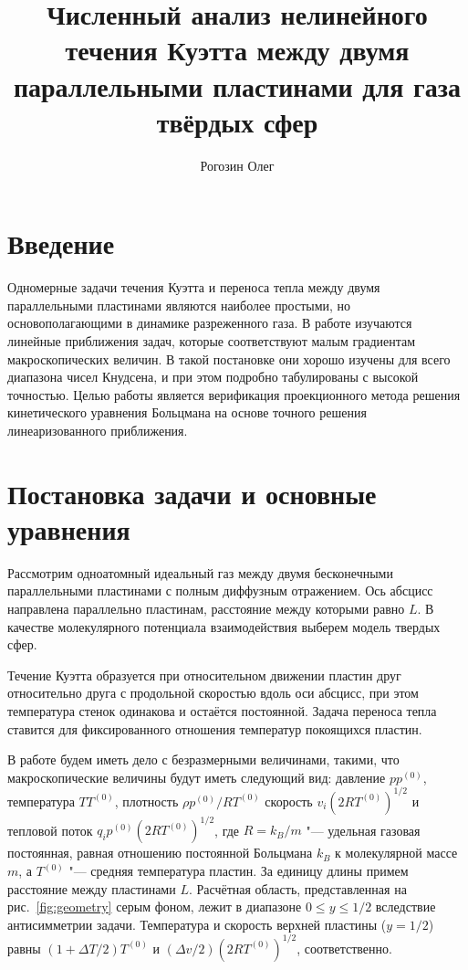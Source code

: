 \documentclass[a4paper,12pt]{article}
\title{Численный анализ нелинейного течения Куэтта между двумя параллельными пластинами для газа твёрдых сфер}
\author{Рогозин Олег}
\begin{document}
\maketitle
\tableofcontents

\section{Введение}

Одномерные задачи течения Куэтта и переноса тепла между двумя параллельными пластинами являются наиболее простыми,
но основополагающими в динамике разреженного газа. В работе изучаются линейные приближения задач,
которые соответствуют малым градиентам макроскопических величин. В такой постановке они хорошо изучены
для всего диапазона чисел Кнудсена, и при этом подробно табулированы с высокой точностью.
Целью работы является верификация проекционного метода решения кинетического уравнения Больцмана
на основе точного решения линеаризованного приближения.

\section{Постановка задачи и основные уравнения}

Рассмотрим одноатомный идеальный газ между двумя бесконечными параллельными пластинами с полным диффузным отражением.
Ось абсцисс направлена параллельно пластинам, расстояние между которыми равно \(L\).
В качестве молекулярного потенциала взаимодействия выберем модель твердых сфер.

Течение Куэтта образуется при относительном движении пластин друг относительно друга с продольной скоростью
вдоль оси абсцисс, при этом температура стенок одинакова и остаётся постоянной.
Задача переноса тепла ставится для фиксированного отношения температур покоящихся пластин.

В работе будем иметь дело с безразмерными величинами, такими, что макроскопические величины будут
иметь следующий вид: давление \(pp^{(0)}\), температура \(TT^{(0)}\), плотность \(\rho p^{(0)}/RT^{(0)}\)
скорость \(v_i(2RT^{(0)})^{1/2}\) и тепловой поток \(q_ip^{(0)}(2RT^{(0)})^{1/2}\),
где \(R = k_B/m\) "--- удельная газовая постоянная,
равная отношению постоянной Больцмана \(k_B\) к молекулярной массе \(m\),
а \(T^{(0)}\) "--- средняя температура пластин.
За единицу длины примем расстояние между пластинами \(L\).
Расчётная область, представленная на рис.~\ref{fig:geometry} серым фоном,
лежит в диапазоне \(0 \le y\le 1/2\) вследствие антисимметрии задачи.
Температура и скорость верхней пластины (\(y=1/2\)) равны \((1+\Delta{T}/2)T^{(0)}\)
и \((\Delta{v}/2)(2RT^{(0)})^{1/2}\), соответственно.
\end{document}
